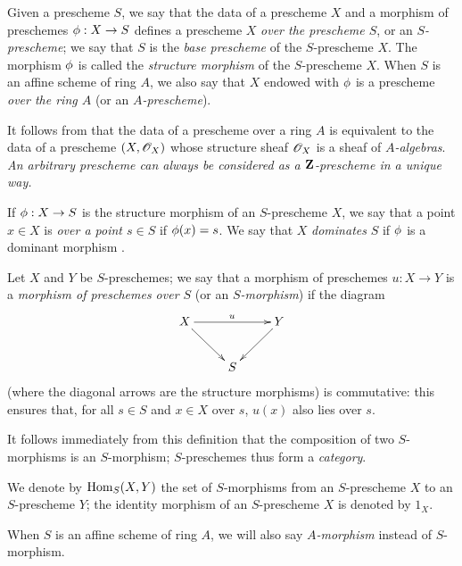 \begin{defn}[2.5.1]
\label{1.2.5.1}
Given a prescheme $S$, we say that the data of a prescheme $X$ and a morphism of preschemes $\vphi:X\to S$ defines a prescheme $X$ \emph{over the prescheme $S$}, or an \emph{$S$-prescheme};
we say that $S$ is the \emph{base prescheme} of the $S$-prescheme $X$.
The morphism $\phi$ is called the \emph{structure morphism} of the $S$-prescheme $X$.
When $S$ is an affine scheme of ring $A$, we also say that $X$ endowed with $\phi$ is a prescheme \emph{over the ring $A$} (or an \emph{$A$-prescheme}).
\end{defn}

It follows from  that the data of a prescheme over a ring $A$ is equivalent to the data of a prescheme $(X,\mathscr{O}_X)$ whose structure sheaf $\mathscr{O}_X$ is a sheaf of \emph{$A$-algebras}.
\emph{An arbitrary prescheme can always be considered as a $\mathbf{Z}$-prescheme in a unique way.}

If $\vphi:X\to S$ is the structure morphism of an $S$-prescheme $X$, we
say that a point $x\in X$ is \emph{over a point $s\in S$} if $\phi(x)=s$. We
say that $X$ \emph{dominates} $S$ if $\phi$ is a dominant morphism .

\begin{env}[2.5.2]
\label{1.2.5.2}
Let $X$ and $Y$ be $S$-preschemes;
we say that a morphism of preschemes $u:X\to Y$ is a \emph{morphism of preschemes over $S$} (or an \emph{$S$-morphism}) if the diagram
\[
  \xymatrix{
    X \ar[rr]^u \ar[dr] & & Y\ar[dl]\\
    & S &
  }
\]
(where the diagonal arrows are the structure morphisms) is commutative: this ensures that, for all $s\in S$ and $x\in X$ over $s$, $u(x)$ also lies over $s$.
\end{env}

It follows immediately from this definition that the composition of two $S$-morphisms is an $S$-morphism;
$S$-preschemes thus form a \emph{category}.

We denote by ${\mathop{\mathrm{Hom}}\nolimits}_S(X,Y)$ the set of $S$-morphisms from an $S$-prescheme $X$ to an $S$-prescheme $Y$;
the identity morphism of an $S$-prescheme $X$ is denoted by $1_X$.

When $S$ is an affine scheme of ring $A$, we will also say \emph{$A$-morphism} instead of $S$-morphism.

